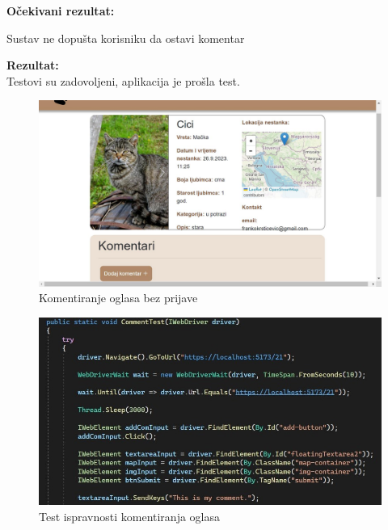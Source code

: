 			\noindent \textbf{Očekivani rezultat:}
			
			\begin{packed_enum}
				\item Sustav ne dopušta korisniku da ostavi komentar
				
			\end{packed_enum}
			
			\noindent \textbf{Rezultat:}\\
			Testovi su zadovoljeni, aplikacija je prošla test.\\
			\begin{figure}[H]
				\includegraphics[width=\textwidth]{komentar_bez_prijave.JPEG}
				\centering
				\caption{Komentiranje oglasa bez prijave}
				\label{fig:komentiranjeoglasabezprijave}
			\end{figure}
			\begin{figure}[H]
				\includegraphics[width=\textwidth]{2test_postcomment.JPEG}
				\centering
				\caption{Test ispravnosti komentiranja oglasa}
				\label{fig:testkomentar}
			\end{figure}
			
			\eject 
		

